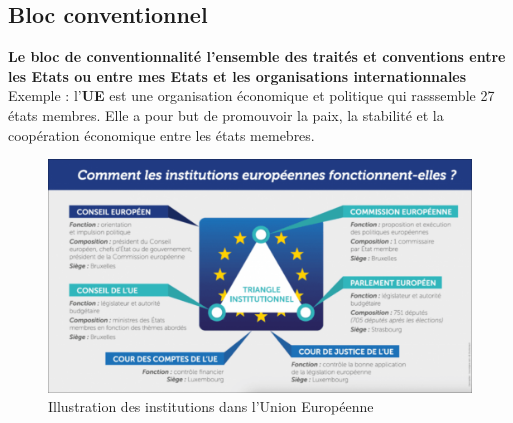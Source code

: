 \subsection{Bloc conventionnel}
\textbf{Le bloc de conventionnalité l'ensemble des traités et conventions entre les Etats ou entre mes Etats et les organisations internationnales} \newline
Exemple : l'\textbf{UE} est une organisation économique et politique qui rasssemble 27 états membres. Elle a pour but de promouvoir la paix, la stabilité et la coopération économique entre les états memebres. \newline
\begin{center}
    \begin{figure}[hbt!]
        \includegraphics[scale=0.3]{Pics/Institutions_UE.png}
        \caption{Illustration des institutions dans l'Union Européenne}
    \end{figure}
\end{center}
\newpage
